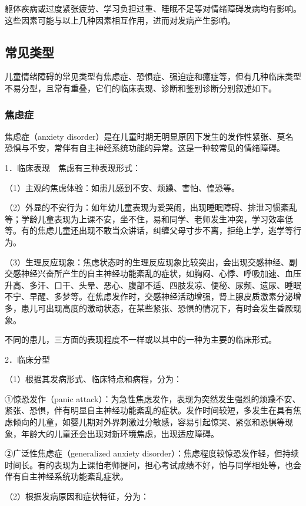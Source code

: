 躯体疾病或过度紧张疲劳、学习负担过重、睡眠不足等对情绪障碍发病均有影响。这些因素可能与以上几种因素相互作用，进而对发病产生影响。

\subsection{常见类型}

儿童情绪障碍的常见类型有焦虑症、恐惧症、强迫症和癔症等，但有几种临床类型不易分型，且常有重叠，它们的临床表现、诊断和鉴别诊断分别叙述如下。

\subsubsection{焦虑症}

焦虑症（anxiety
disorder）是在儿童时期无明显原因下发生的发作性紧张、莫名恐惧与不安，常伴有自主神经系统功能的异常。这是一种较常见的情绪障碍。

1．临床表现　焦虑有三种表现形式：

（1）主观的焦虑体验：如患儿感到不安、烦躁、害怕、惶恐等。

（2）外显的不安行为：如年幼儿童表现为爱哭闹，出现睡眠障碍、排泄习惯紊乱等；学龄儿童表现为上课不安，坐不住，易和同学、老师发生冲突，学习效率低等。有的焦虑儿童还出现不敢当众讲话，纠缠父母寸步不离，拒绝上学，逃学等行为。

（3）生理反应现象：焦虑状态时的生理反应现象比较突出，会出现交感神经、副交感神经兴奋所产生的自主神经功能紊乱的症状，如胸闷、心悸、呼吸加速、血压升高、多汗、口干、头晕、恶心、腹部不适、四肢发凉、便秘、尿频、遗尿、睡眠不宁、早醒、多梦等。在焦虑发作时，交感神经活动增强，肾上腺皮质激素分泌增多，患儿可出现高度的激动状态，在某些紧张、恐惧的情况下，有时会发生昏厥现象。

不同的患儿，三方面的表现程度不一样或以其中的一种为主要的临床形式。

2．临床分型

（1）根据其发病形式、临床特点和病程，分为：

①惊恐发作（panic
attack）：为急性焦虑发作，表现为突然发生强烈的烦躁不安、紧张、恐惧，伴有明显自主神经功能紊乱的症状。发作时间较短，多发生在具有焦虑倾向的儿童，如婴儿期对外界刺激过分敏感，容易引起惊哭、紧张和恐惧等现象，年龄大的儿童还会出现对新环境焦虑，出现适应障碍。

②广泛性焦虑症（generalized anxiety
disorder）：焦虑程度较惊恐发作轻，但持续时间长。有的表现为上课怕老师提问，担心考试成绩不好，怕与同学相处等，也会伴有自主神经系统功能紊乱症状。

（2）根据发病原因和症状特征，分为：

